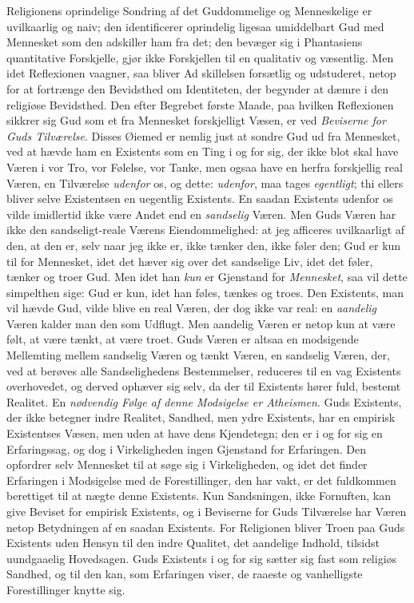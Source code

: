 Religionens oprindelige Sondring af det Guddommelige og Menneskelige er
uvilkaarlig og naiv; den identificerer oprindelig ligesaa umiddelbart Gud med
Mennesket som den adskiller ham fra det; den bevæger sig i Phantasiens
quantitative Forskjelle, gjør ikke Forskjellen til en qualitativ og væsentlig.
Men idet Reflexionen vaagner, saa bliver Ad\-%
skillelsen forsætlig og udstuderet, netop for at fortrænge den Bevidsthed om
Identiteten, der begynder at dæmre i den religiøse Bevidsthed. Den efter
Begrebet første Maade, paa hvilken Reflexionen sikkrer sig Gud som et fra
Mennesket forskjelligt Væsen, er ved \emph{Beviserne for Guds Tilværelse}. Disses
Øiemed er nemlig just at sondre Gud ud fra Mennesket, ved at hævde ham en
Existents som en Ting i og for sig, der ikke blot skal have Væren i vor Tro,
vor Følelse, vor Tanke, men ogsaa have en herfra forskjellig real Væren, en
Tilværelse \emph{udenfor} os, og dette: \emph{udenfor}, maa tages \emph{egentligt}; thi
ellers bliver selve Existentsen en uegentlig Existents. En saadan Existents
udenfor os vilde imidlertid ikke være Andet end en \emph{sandselig} Væren. Men
Guds Væren har ikke den sandseligt-reale Værens Eiendommelighed: at jeg
afficeres uvilkaarligt af den, at den er, selv naar jeg ikke er, ikke tænker
den, ikke føler den; Gud er kun til for Mennesket, idet det hæver sig over det
sandselige Liv, idet det føler, tænker og troer Gud. Men idet han \emph{kun} er
Gjenstand for \emph{Mennesket}, saa vil dette simpelthen sige: Gud er kun, idet han
føles, tænkes og troes. Den Existents, man vil hævde Gud, vilde blive en real
Væren, der dog ikke var real: en \emph{aandelig} Væren kalder man den som Udflugt.
Men aandelig Væren er netop kun at være følt, at være tænkt, at være troet.
Guds Væren er altsaa en modsigende Mellemting mellem sandselig Væren og tænkt
Væren, en sandselig Væren, der, ved at berøves alle Sandselighedens
Bestemmelser, reduceres til en vag Existents overhovedet, og derved ophæver sig
selv, da der til Existents hører fuld, bestemt Realitet. En \emph{nødvendig Følge
af denne Modsigelse er Atheismen}. Guds Existents, der ikke betegner indre
Realitet, Sandhed, men ydre Existents, har en empirisk Existentses Væsen, men
uden at have dens Kjendetegn; den er i og for sig en Erfaringssag, og dog i
Virkeligheden ingen Gjenstand for Erfaringen. Den opfordrer selv Mennesket til
at søge sig i Virkeligheden, og idet det finder Erfaringen i Modsigelse med de
Forestillinger, den har vakt, er det fuldkommen berettiget til
 at nægte denne Existents. Kun Sandsningen, ikke Fornuften, kan give Beviset for
empirisk Existents, og i Beviserne for Guds Tilværelse har Væren netop
Betydningen af en saadan Existents. For Religionen bliver Troen paa Guds
Existents uden Hensyn til den indre Qualitet, det aandelige Indhold, tilsidst
uundgaaelig Hovedsagen. Guds Existents i og for sig sætter sig fast som religiøs
Sandhed, og til den kan, som Erfaringen viser, de raaeste og vanhelligste
Forestillinger knytte sig.

